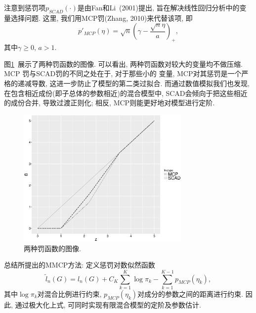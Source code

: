 \documentclass[a4paper,12pt,openany,oneside,utf-8]{ctexbook}
\begin{document}
注意到惩罚项$p_{SCAD}(\cdot)$是由Fan和Li~(2001)提出, 旨在解决线性回归分析中的变量选择问题. 这里, 我们用MCP罚(Zhang, 2010)来代替该项, 即
\begin{equation*}
  {p}'_{MCP}(\eta)=\sqrt{n}(\gamma- \frac{\sqrt{n}\eta}{a})_{+},
\end{equation*}
其中$\gamma \geq 0$, $a>1$.

图\ref{fig:Plots of the penalty funcrions}~展示了两种罚函数的图像. 可以看出, 两种罚函数对较大的变量均不做压缩. MCP 罚与SCAD罚的不同之处在于, 对于那些小的
变量, MCP对其惩罚是一个严格的递减导数, 这进一步防止了模型的第二类过拟合. 而通过数值模拟我们也发现, 在包含相近成份(即子总体的参数相近)的混合模型中, SCAD会倾向于把这些相近的成份合并, 导致过渡正则化; 相反, MCP则能更好地对模型进行定阶.
\begin{figure}[htbp]
  \centering
  \includegraphics[width = 0.75\textwidth]{R_Plots_penalty_funcrions.eps}
  \caption{两种罚函数的图像. }
  \label{fig:Plots of the penalty funcrions} %
\end{figure}

总结所提出的MMCP方法: 定义惩罚对数似然函数
\begin{equation}
\label{equ:penalized log-likelihood function in MMCP}
  \tilde{l}_{n}(G)=l_{n}(G) + C_{K}\sum_{k=1}^{K}\log\pi_{k} - \sum_{k=1}^{K-1}p_{MCP}(\eta_{k}),
\end{equation}
其中$\log\pi_{k}$对混合比例进行约束, $p_{MCP}(\eta_{k})$对成分的参数之间的距离进行约束. 因此, 通过极大化上式, 可同时实现有限混合模型的定阶及参数估计.
\end{document}
